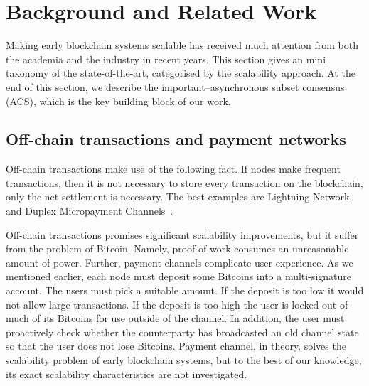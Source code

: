 
\section{Background and Related Work}

Making early blockchain systems scalable has received much attention from both the academia and the industry in recent years.
This section gives an mini taxonomy of the state-of-the-art, categorised by the scalability approach.
At the end of this section,
we describe the important--asynchronous subset consensus (ACS),
which is the key building block of our work.

\subsection{Off-chain transactions and payment networks}
Off-chain transactions make use of the following fact.
If nodes make frequent transactions,
then it is not necessary to store every transaction on the blockchain,
only the net settlement is necessary.
The best examples are Lightning Network~\cite{lightningnetwork} and Duplex Micropayment Channels~\cite{decker2015fast}.

Off-chain transactions promises significant scalability improvements, but it suffer from the problem of Bitcoin.
Namely, proof-of-work consumes an unreasonable amount of power.
Further, payment channels complicate user experience.
As we mentioned earlier, each node must deposit some Bitcoins into a multi-signature account.
The users must pick a suitable amount.
If the deposit is too low it would not allow large transactions.
If the deposit is too high the user is locked out of much of its Bitcoins for use outside of the channel.
In addition, the user must proactively check whether the counterparty has broadcasted an old channel state so that the user does not lose Bitcoins.
Payment channel, in theory, solves the scalability problem of early blockchain systems,
but to the best of our knowledge, its exact scalability characteristics are not investigated.



